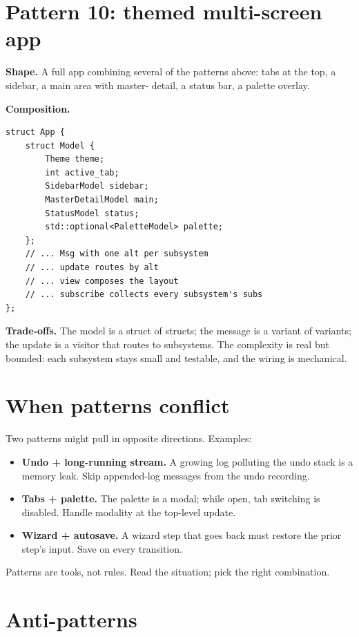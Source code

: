 \section{Pattern 10: themed multi-screen app}

\textbf{Shape.} A full app combining several of the patterns
above: tabs at the top, a sidebar, a main area with master-
detail, a status bar, a palette overlay.

\textbf{Composition.}

\begin{lstlisting}
struct App {
    struct Model {
        Theme theme;
        int active_tab;
        SidebarModel sidebar;
        MasterDetailModel main;
        StatusModel status;
        std::optional<PaletteModel> palette;
    };
    // ... Msg with one alt per subsystem
    // ... update routes by alt
    // ... view composes the layout
    // ... subscribe collects every subsystem's subs
};
\end{lstlisting}

\textbf{Trade-offs.} The model is a struct of structs; the message
is a variant of variants; the update is a visitor that routes
to subsystems. The complexity is real but bounded: each
subsystem stays small and testable, and the wiring is
mechanical.

\section{When patterns conflict}

Two patterns might pull in opposite directions. Examples:

\begin{itemize}[leftmargin=*]
  \item \textbf{Undo + long-running stream.} A growing log
    polluting the undo stack is a memory leak. Skip
    appended-log messages from the undo recording.
  \item \textbf{Tabs + palette.} The palette is a modal; while
    open, tab switching is disabled. Handle modality at the
    top-level update.
  \item \textbf{Wizard + autosave.} A wizard step that goes
    back must restore the prior step's input. Save on every
    transition.
\end{itemize}

Patterns are tools, not rules. Read the situation; pick the
right combination.

\section{Anti-patterns}

